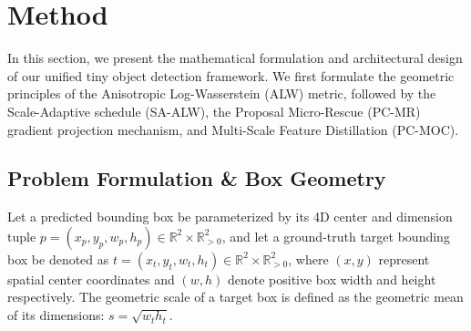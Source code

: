 \section{Method}
\label{sec:method}

In this section, we present the mathematical formulation and architectural design of our unified tiny object detection framework. We first formulate the geometric principles of the Anisotropic Log-Wasserstein (ALW) metric, followed by the Scale-Adaptive schedule (SA-ALW), the Proposal Micro-Rescue (PC-MR) gradient projection mechanism, and Multi-Scale Feature Distillation (PC-MOC).

\subsection{Problem Formulation \& Box Geometry}
Let a predicted bounding box be parameterized by its 4D center and dimension tuple $p = (x_p, y_p, w_p, h_p) \in \mathbb{R}^2 \times \mathbb{R}_{>0}^2$, and let a ground-truth target bounding box be denoted as $t = (x_t, y_t, w_t, h_t) \in \mathbb{R}^2 \times \mathbb{R}_{>0}^2$, where $(x, y)$ represent spatial center coordinates and $(w, h)$ denote positive box width and height respectively. The geometric scale of a target box is defined as the geometric mean of its dimensions: $s = \sqrt{w_t h_t}$.

